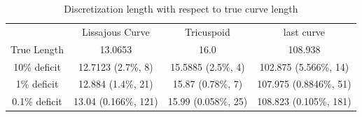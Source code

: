 \begin{table}[h!] \caption{\label{tab:curvelength} Discretization length with respect to true curve length}
\begin{tabular}{cccc}
 & Lissajous Curve & Tricuspoid & last curve \\
True Length & 13.0653 & 16.0 & 108.938\\
10\% deficit & 12.7123 (2.7\%, 8) & 15.5885 (2.5\%, 4) & 102.875 (5.566\%, 14)\\
1\% deficit & 12.884 (1.4\%, 21) & 15.87 (0.78\%, 7) & 107.975 (0.8846\%, 51)\\
0.1\% deficit & 13.04 (0.166\%, 121) & 15.99 (0.058\%, 25) & 108.823 (0.105\%, 181)
\end{tabular}
\end{table}
